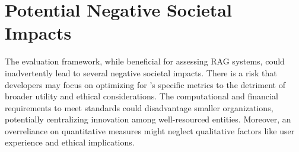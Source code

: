 \section{Potential Negative Societal Impacts}
\label{appendix:social_impact}


The \benchname\space evaluation framework, while beneficial for assessing RAG systems, could inadvertently lead to several negative societal impacts. There is a risk that developers may focus on optimizing for \benchname's specific metrics to the detriment of broader utility and ethical considerations. The computational and financial requirements to meet \benchname\space standards could disadvantage smaller organizations, potentially centralizing innovation among well-resourced entities. Moreover, an overreliance on quantitative measures might neglect qualitative factors like user experience and ethical implications.